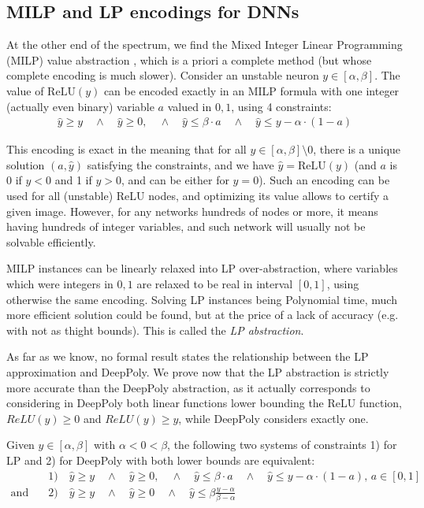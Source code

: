 \documentclass{llncs}
\newcommand{\ReLU}{\mathrm{ReLU}}
\begin{document}
\subsection{MILP and LP encodings for DNNs}

At the other end of the spectrum, we find the Mixed Integer Linear Programming (MILP) value abstraction \cite{MILP}, which is a priori a complete method (but whose complete encoding is much slower). 
Consider an unstable neuron $y \in[\alpha,\beta]$. The value of $\ReLU(y)$ can be encoded exactly in an MILP formula with one integer (actually even binary) variable $a$ valued in ${0,1}$, using 4 constraints:
\vspace{-0.1cm}
\begin{align*}
	\hat{y} \geq y \quad \wedge \quad \hat{y} \geq 0, \quad \wedge \quad \hat{y} \leq \beta \cdot a \quad \wedge \quad \hat{y} \leq y-\alpha \cdot (1-a)
\end{align*}

This encoding is exact in the meaning that \cite{MILP} for all $y \in [\alpha,\beta] \setminus 0$, there is a unique solution $(a,\hat{y})$ satisfying the constraints, and we have $\hat{y}=\ReLU(y)$ (and $a$ is 0 if $y < 0$ and 1 if $y>0$, and can be either for $y=0$). Such an encoding can be used for all (unstable) ReLU nodes, and optimizing its value allows to certify a given image. However, for any networks hundreds of nodes or more, it means having hundreds of integer variables, and such network will usually not be solvable efficiently.

MILP instances can be linearly relaxed into LP over-abstraction, where variables which were integers in 
${0,1}$ are relaxed to be real in interval $[0,1]$, using otherwise the same encoding. 
Solving LP instances being Polynomial time, much more efficient solution could be found, but at the price of a lack of accuracy (e.g. with not as thight bounds). This is called the {\em LP abstraction}.

As far as we know, no formal result states the relationship between the LP approximation and DeepPoly.
We prove now that the LP abstraction is strictly more accurate than the DeepPoly abstraction, as it actually corresponds to considering in DeepPoly both linear functions lower bounding the ReLU function, $ReLU(y) \geq 0$ and $ReLU(y) \geq y$, while DeepPoly considers exactly one.

\begin{proposition}
	\label{LP}
 Given $y \in [\alpha,\beta]$ with $\alpha < 0 < \beta$, the following two systems of constraints 
 1) for LP and 2) for DeepPoly with both lower bounds are equivalent:
 \vspace{-0.3cm}
 \begin{align*}
	 & 1) \quad \hat{y} \geq y \quad \wedge \quad \hat{y} \geq 0, \quad \wedge \quad \hat{y} \leq \beta \cdot a \quad \wedge \quad \hat{y} \leq y-\alpha \cdot (1-a), \, a \in [0,1] \\
	 \text{and} \quad  & 2)  \quad \hat{y} \geq y \quad \wedge \quad \hat{y} \geq 0 \quad \wedge \quad \hat{y} \leq \beta \frac{y-\alpha}{\beta-\alpha}
\end{align*} 
\end{proposition}
\end{document}
